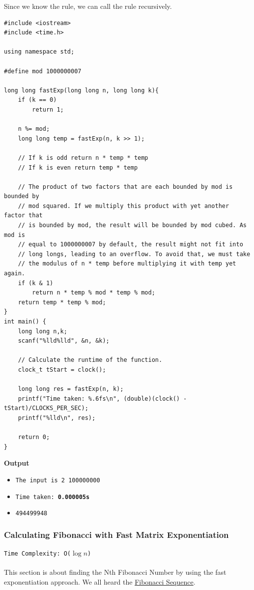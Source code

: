 \documentclass[12pt]{article}
\begin{document}
Since we know the rule, we can call the rule recursively.
\begin{verbatim}
#include <iostream>
#include <time.h>

using namespace std;

#define mod 1000000007

long long fastExp(long long n, long long k){
    if (k == 0)
        return 1;
    
    n %= mod;
    long long temp = fastExp(n, k >> 1);
    
    // If k is odd return n * temp * temp
    // If k is even return temp * temp
    
    // The product of two factors that are each bounded by mod is bounded by
    // mod squared. If we multiply this product with yet another factor that
    // is bounded by mod, the result will be bounded by mod cubed. As mod is
    // equal to 1000000007 by default, the result might not fit into
    // long longs, leading to an overflow. To avoid that, we must take
    // the modulus of n * temp before multiplying it with temp yet again.
    if (k & 1)
        return n * temp % mod * temp % mod;
    return temp * temp % mod;
}
int main() {
    long long n,k;
    scanf("%lld%lld", &n, &k);
    
    // Calculate the runtime of the function.
    clock_t tStart = clock();
    
    long long res = fastExp(n, k);
    printf("Time taken: %.6fs\n", (double)(clock() - tStart)/CLOCKS_PER_SEC);
    printf("%lld\n", res);
    
    return 0;
}

\end{verbatim}
\textbf{Output}

\begin{itemize}
  \item \texttt{The input is 2 100000000} 
  \item \texttt{Time taken: \textbf{0.000005s}} 
  \item \texttt{494499948}
\end{itemize}

\subsubsection{Calculating Fibonacci with Fast Matrix Exponentiation}
\texttt{Time Complexity: O($\log{n}$) } \\ \\
This section is about finding the Nth Fibonacci Number by using the fast exponentiation approach. We all heard the \href{https://en.wikipedia.org/wiki/Fibonacci_number}{Fibonacci Sequence}. 
\end{document}
